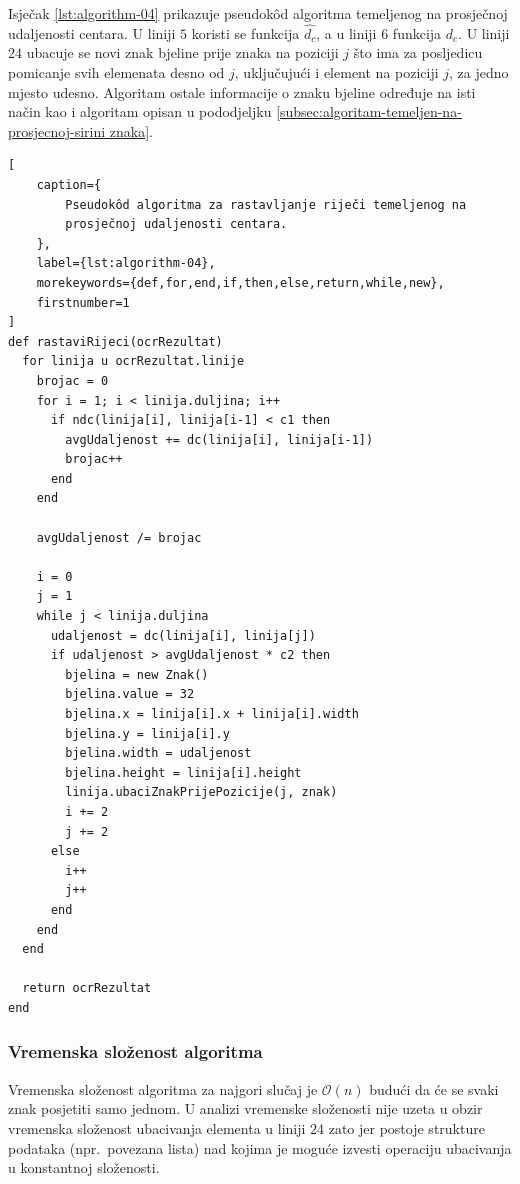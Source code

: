 \documentclass[times, utf8, zavrsni]{fer}
\begin{document}
Isječak \ref{lst:algorithm-04} prikazuje pseudokôd algoritma temeljenog na
prosječnoj udaljenosti centara. U liniji $5$ koristi se funkcija $\hat{d_c}$,
a u liniji $6$ funkcija $d_c$. U liniji $24$ ubacuje se novi znak bjeline prije
znaka na poziciji $j$ što ima za posljedicu pomicanje svih elemenata desno od
$j$, uključujući i element na poziciji $j$, za jedno mjesto udesno. Algoritam
ostale informacije o znaku bjeline određuje na isti način kao i algoritam
opisan u pododjeljku
\ref{subsec:algoritam-temeljen-na-prosjecnoj-sirini znaka}.

\pagebreak

\begin{lstlisting}[
    caption={
        Pseudokôd algoritma za rastavljanje riječi temeljenog na
        prosječnoj udaljenosti centara.
    },
    label={lst:algorithm-04},
    morekeywords={def,for,end,if,then,else,return,while,new},
    firstnumber=1
]
def rastaviRijeci(ocrRezultat)
  for linija u ocrRezultat.linije
    brojac = 0
    for i = 1; i < linija.duljina; i++
      if ndc(linija[i], linija[i-1] < c1 then
        avgUdaljenost += dc(linija[i], linija[i-1])
        brojac++
      end
    end

    avgUdaljenost /= brojac

    i = 0
    j = 1
    while j < linija.duljina
      udaljenost = dc(linija[i], linija[j])
      if udaljenost > avgUdaljenost * c2 then
        bjelina = new Znak()
        bjelina.value = 32
        bjelina.x = linija[i].x + linija[i].width
        bjelina.y = linija[i].y
        bjelina.width = udaljenost
        bjelina.height = linija[i].height
        linija.ubaciZnakPrijePozicije(j, znak)
        i += 2
        j += 2
      else
        i++
        j++
      end
    end
  end

  return ocrRezultat
end
\end{lstlisting}


\subsubsection{Vremenska složenost algoritma}
Vremenska složenost algoritma za najgori slučaj je $\mathcal{O}(n)$ budući
da će se svaki znak posjetiti samo jednom. U analizi vremenske složenosti
nije uzeta u obzir vremenska složenost ubacivanja elementa u liniji $24$ zato
jer postoje strukture podataka (npr.\ povezana lista) nad kojima je moguće
izvesti operaciju ubacivanja u konstantnoj složenosti.
\end{document}
